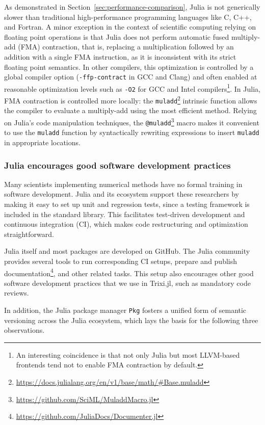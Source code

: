 \documentclass[hidelinks]{juliacon} %
\newcommand{\trixi}{Trixi.jl\xspace}
\begin{document}
As demonstrated in Section~\ref{sec:performance-comparison},
Julia is not generically slower than traditional high-performance programming
languages like C, C++, and Fortran. A minor exception in the context of scientific
computing relying on floating point operations is that Julia does not perform
automatic fused multiply-add (FMA) contraction, that is, replacing a multiplication
followed by an addition with a single FMA instruction, as it is inconsistent
with its strict floating point semantics. In other compilers, this optimization
is controlled by a global compiler option (\lstinline{-ffp-contract} in GCC and
Clang) and often enabled at reasonable optimization levels such as \lstinline{-O2}
for GCC and Intel compilers\footnote{An interesting coincidence is that not only
Julia but most LLVM-based frontends tend not to enable FMA contraction by default.}.
In Julia, FMA contraction is controlled more locally: the
\lstinline{muladd}\footnote{\url{https://docs.julialang.org/en/v1/base/math/\#Base.muladd}}
intrinsic function allows the compiler to evaluate a multiply-add using the most
efficient method. Relying on Julia's code manipulation techniques, the
\lstinline{@muladd}\footnote{\url{https://github.com/SciML/MuladdMacro.jl}}
macro makes it convenient to use the \lstinline{muladd} function by
syntactically rewriting expressions to insert \lstinline{muladd} in appropriate
locations.

\subsubsection{Julia encourages good software development practices}

Many scientists implementing numerical methods have no formal training
in software development. Julia and its ecosystem support these
researchers by making it easy to set up unit and regression tests, since a
testing framework is included in the standard library. This facilitates test-driven
development and continuous integration (CI), which makes code restructuring
and optimization straightforward.

Julia itself and most packages are developed on GitHub. The Julia community provides
several tools to run corresponding CI setups, prepare and publish
documentation\footnote{\url{https://github.com/JuliaDocs/Documenter.jl}},
and other related tasks. This setup also encourages other good software development
practices that we use in \trixi, such as mandatory code reviews.

In addition, the Julia package manager \lstinline{Pkg} fosters a unified form of semantic versioning
across the Julia ecosystem, which lays the basis for the following three
observations.
\end{document}
